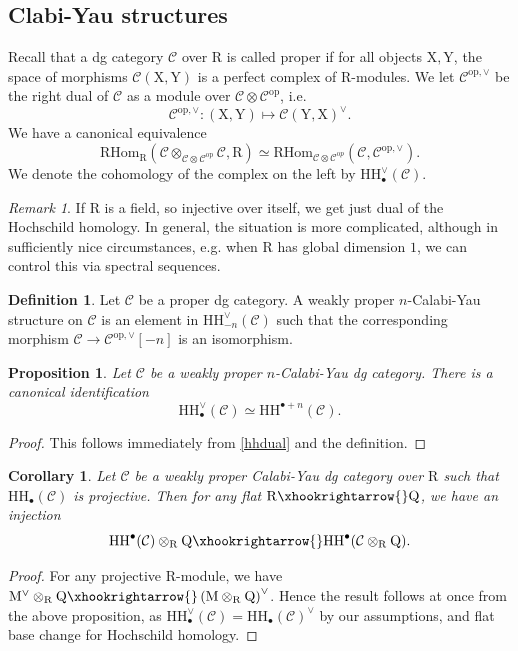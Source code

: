\documentclass{article}
\theoremstyle{plain}
\newtheorem{corollary}[theorem]{Corollary}
\newtheorem{proposition}[theorem]{Proposition}
\theoremstyle{definition}
\newtheorem{definition}[theorem]{Definition}
\theoremstyle{remark}
\newtheorem{remark}[theorem]{Remark}
\newcommand{\mr}{\mathrm}
\newcommand{\Cc}{\mathcal C}
\newcommand{\3}{\vspace{3mm}}
\newcommand{\2}{\vspace{2mm}}
\newcommand{\1}{\vspace{1mm}}
\begin{document}
\subsection{Clabi-Yau structures}
Recall that a dg category $\Cc$ over $\mr{R}$ is called proper if for all objects $\mr{X,Y}$, the space of morphisms $\Cc(\mr{X,Y})$ is a perfect complex of $\mr{R}$-modules. We let $\Cc^{\mr{op},\vee}$ be the right dual of $\Cc$ as a module over $\Cc\otimes \Cc^\mr{op}$, i.e. $$\Cc^{\mr{op},\vee} : (\mr{X,Y}) \mapsto \Cc(\mr{Y,X})^\vee.$$ We have a canonical equivalence \begin{equation}\label{hhdual}\mr{RHom}_{\mr{R}}(\Cc\otimes_{\Cc\otimes \Cc^{\mr{op}}}\Cc,\mr{R})\simeq \mr{RHom}_{\Cc\otimes \Cc^{\mr op}}\left(\Cc,\Cc^{\mr{op},\vee}\right).\end{equation}
We denote the cohomology of the complex on the left by $\mr{HH}_\bullet^{\vee}(\Cc)$. 
\2
\begin{remark}
If $\mr{R}$ is a field, so injective over itself, we get just dual of the Hochschild homology. In general, the situation is more complicated, although in sufficiently nice circumstances, e.g. when $\mr{R}$ has global dimension $1$, we can control this via spectral sequences.
\end{remark}
\2
\begin{definition}
Let $\Cc$ be a proper dg category. A weakly proper $n$-Calabi-Yau structure on $\Cc$ is an element in $\mr{HH}^{\vee}_{-n}(\Cc)$ such that the corresponding morphism $\Cc\to \Cc^{\mr{op},\vee}[-n]$ is an isomorphism.
\end{definition}
\2
\begin{proposition}
Let $\Cc$ be a weakly proper $n$-Calabi-Yau dg category. There is a canonical identification $$\mr{HH}^{\vee}_{\bullet}(\Cc)\simeq \mr{HH}^{\bullet+n}(\Cc).$$
\end{proposition}
\begin{proof}
This follows immediately from \eqref{hhdual} and the definition.
\end{proof}
\begin{corollary}\label{hhinj}
Let $\Cc$ be a  weakly proper Calabi-Yau dg category over $\mr{R}$ such that $\mr{HH}_\bullet(\Cc)$ is projective. Then for any flat $\mr{R}\xhookrightarrow{}\mr{Q}$, we have an injection $$\mr{HH}^{\bullet}(\Cc)\otimes_{\mr{R}} \mr{Q}\xhookrightarrow{} \mr{HH}^{\bullet}(\Cc\otimes_{\mr{R}}\mr{Q}).$$
\end{corollary}
\begin{proof}
For any projective $\mr{R}$-module, we have $\mr{M}^\vee\otimes_{\mr{R}} \mr{Q} \xhookrightarrow{} \left(\mr{M}\otimes_\mr{R}\mr{Q}\right)^\vee$. Hence the result follows at once from the above proposition, as $\mr{HH}_\bullet^\vee(\Cc)=\mr{HH}_\bullet(\Cc)^\vee$ by our assumptions, and flat base change for Hochschild homology.
\end{proof}
\end{document}

